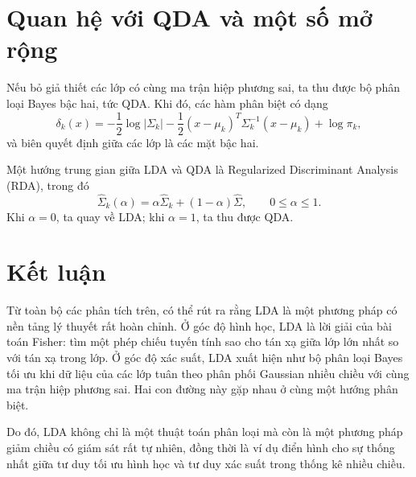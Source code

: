 \section{Quan hệ với QDA và một số mở rộng}

Nếu bỏ giả thiết các lớp có cùng ma trận hiệp phương sai, ta thu được bộ phân loại Bayes bậc hai, tức QDA. Khi đó, các hàm phân biệt có dạng
\begin{equation}
\delta_k(x)= -\frac12\log |\Sigma_k|
-\frac12(x-\mu_k)^T\Sigma_k^{-1}(x-\mu_k)
+\log \pi_k,
\end{equation}
và biên quyết định giữa các lớp là các mặt bậc hai.

Một hướng trung gian giữa LDA và QDA là Regularized Discriminant Analysis (RDA), trong đó
\begin{equation}
\hat\Sigma_k(\alpha)=\alpha\hat\Sigma_k+(1-\alpha)\hat\Sigma,
\qquad 0\le \alpha \le 1.
\end{equation}
Khi $\alpha=0$, ta quay về LDA; khi $\alpha=1$, ta thu được QDA.

\section{Kết luận}

Từ toàn bộ các phân tích trên, có thể rút ra rằng LDA là một phương pháp có nền tảng lý thuyết rất hoàn chỉnh. Ở góc độ hình học, LDA là lời giải của bài toán Fisher: tìm một phép chiếu tuyến tính sao cho tán xạ giữa lớp lớn nhất so với tán xạ trong lớp. Ở góc độ xác suất, LDA xuất hiện như bộ phân loại Bayes tối ưu khi dữ liệu của các lớp tuân theo phân phối Gaussian nhiều chiều với cùng ma trận hiệp phương sai. Hai con đường này gặp nhau ở cùng một hướng phân biệt.

Do đó, LDA không chỉ là một thuật toán phân loại mà còn là một phương pháp giảm chiều có giám sát rất tự nhiên, đồng thời là ví dụ điển hình cho sự thống nhất giữa tư duy tối ưu hình học và tư duy xác suất trong thống kê nhiều chiều.